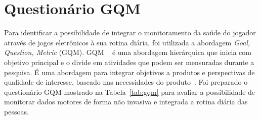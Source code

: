\chapter{Questionário GQM}\label{apend:gqm}
Para identificar a possibilidade de integrar o monitoramento da saúde do jogador através de jogos eletrônicos à sua rotina diária, foi utilizada a abordagem \textit{Goal, Question, Metric} (GQM). GQM ~\cite{basili94} é uma abordagem hierárquica que inicia com objetivo principal e o divide em atividades que podem ser mensuradas durante a pesquisa. É uma abordagem para integrar objetivos a produtos e perspectivas de qualidade de interesse, baseado nas necessidades do produto~\cite{van1999goal}. 
Foi preparado o questionário GQM mostrado na Tabela~\ref{tab:gqm} para avaliar a possibilidade de monitorar dados motores de forma não invasiva e integrada a rotina diária das pessoas.

